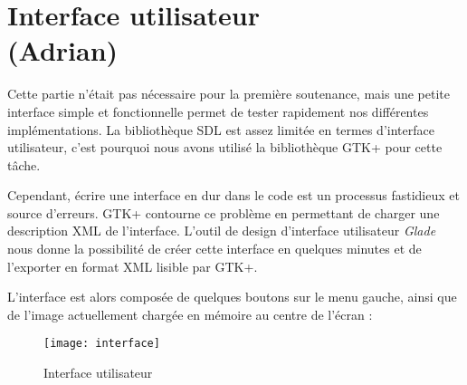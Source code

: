 \chapter{Interface utilisateur\\ (Adrian)}

Cette partie n'était pas nécessaire pour la première soutenance, mais une petite
interface simple et fonctionnelle permet de tester rapidement nos différentes
implémentations. La bibliothèque SDL est assez limitée en termes d'interface
utilisateur, c'est pourquoi nous avons utilisé la bibliothèque GTK+ pour cette
tâche.

Cependant, écrire une interface en dur dans le code est un processus fastidieux
et source d'erreurs. GTK+ contourne ce problème en permettant de charger une
description XML de l'interface. L'outil de design d'interface utilisateur
\textit{Glade} nous donne la possibilité de créer cette interface en quelques
minutes et de l'exporter en format XML lisible par GTK+.

\newpage

L'interface est alors composée de quelques boutons sur le menu gauche, ainsi que
de l'image actuellement chargée en mémoire au centre de l'écran :

\begin{figure}[H]
    \centering
    \texttt{[image: interface]}
    \caption{Interface utilisateur}
\end{figure}
